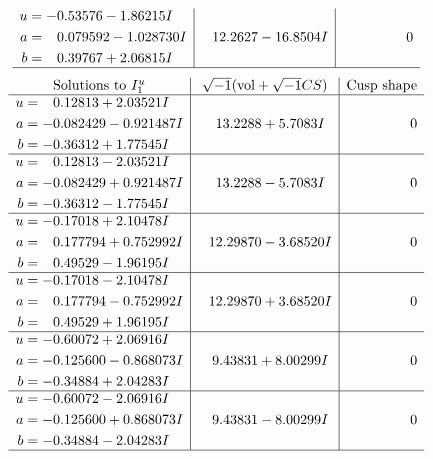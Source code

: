 \documentclass[1p]{elsarticle_modified}
\theoremstyle{definition}
\newcommand{\I}{\sqrt{-1}}
\begin{document}
$$\begin{array}{c|c|c}
\begin{aligned}
u &= -0.53576 - 1.86215 I \\
a &= \phantom{-}0.079592 - 1.028730 I \\
b &= \phantom{-}0.39767 + 2.06815 I\end{aligned}
 & \phantom{-}12.2627 - 16.8504 I & \phantom{-0.000000 } 0\\
 \hline 
 \end{array}$$\newpage$$\begin{array}{c|c|c}  
\text{Solutions to }I^u_{1}& \I (\text{vol} + \sqrt{-1}CS) & \text{Cusp shape}\\
 \hline 
\begin{aligned}
u &= \phantom{-}0.12813 + 2.03521 I \\
a &= -0.082429 - 0.921487 I \\
b &= -0.36312 + 1.77545 I\end{aligned}
 & \phantom{-}13.2288 + 5.7083 I & \phantom{-0.000000 } 0 \\ \hline\begin{aligned}
u &= \phantom{-}0.12813 - 2.03521 I \\
a &= -0.082429 + 0.921487 I \\
b &= -0.36312 - 1.77545 I\end{aligned}
 & \phantom{-}13.2288 - 5.7083 I & \phantom{-0.000000 } 0 \\ \hline\begin{aligned}
u &= -0.17018 + 2.10478 I \\
a &= \phantom{-}0.177794 + 0.752992 I \\
b &= \phantom{-}0.49529 - 1.96195 I\end{aligned}
 & \phantom{-}12.29870 - 3.68520 I & \phantom{-0.000000 } 0 \\ \hline\begin{aligned}
u &= -0.17018 - 2.10478 I \\
a &= \phantom{-}0.177794 - 0.752992 I \\
b &= \phantom{-}0.49529 + 1.96195 I\end{aligned}
 & \phantom{-}12.29870 + 3.68520 I & \phantom{-0.000000 } 0 \\ \hline\begin{aligned}
u &= -0.60072 + 2.06916 I \\
a &= -0.125600 - 0.868073 I \\
b &= -0.34884 + 2.04283 I\end{aligned}
 & \phantom{-}9.43831 + 8.00299 I & \phantom{-0.000000 } 0 \\ \hline\begin{aligned}
u &= -0.60072 - 2.06916 I \\
a &= -0.125600 + 0.868073 I \\
b &= -0.34884 - 2.04283 I\end{aligned}
 & \phantom{-}9.43831 - 8.00299 I & \phantom{-0.000000 } 0\\
 \hline 
 \end{array}$$\newpage\newpage\renewcommand{\arraystretch}{1}
\end{document}

